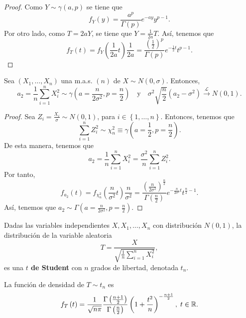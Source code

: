 \begin{proof}
Como $\displaystyle Y \sim \gamma\left(a, p\right) $ se tiene que
\[f_{Y}\left(y\right)=\frac{a^{p}}{\Gamma\left(p\right)}e^{-ay}y^{p-1} .\]
Por otro lado, como $\displaystyle T = 2aY $, se tiene que $\displaystyle Y = \frac{1}{2a}T $. Así, tenemos que
\[f_{T}\left(t\right)=f_{Y}\left(\frac{1}{2a}t\right)\frac{1}{2a}=\frac{\left(\frac{1}{2}\right)^{p}}{\Gamma\left(p\right)}e^{-\frac{1}{2}t}t ^{p-1} .\]
\end{proof}
\begin{prop}
Sea $\displaystyle \left(X_{1}, \ldots, X_{n}\right) $ una m.a.s. $\displaystyle \left(n\right) $ de $\displaystyle X \sim N\left(0,\sigma \right) $. Entonces, 
\[a_{2}=\frac{1}{n}\sum^{n}_{i = 1}X_{i}^{2} \sim \gamma\left(a = \frac{n}{2\sigma^{2}}, p= \frac{n}{2}\right) \quad \text{y} \quad \sigma^{2}\sqrt{\frac{n}{2}}\left(a_{2}-\sigma^{2}\right)\xrightarrow{\mathcal{L}} N\left(0,1\right) .\]
\end{prop}
\begin{proof}
	Sea $\displaystyle Z_{i}=\frac{X_{i}}{\sigma } \sim N\left(0,1\right) $, para $\displaystyle i \in \left\{ 1, \ldots, n\right\}  $. Entonces, tenemos que 
	\[\sum^{n}_{i= 1}Z_{i}^{2}\sim \chi_{n}^{2}\equiv \gamma\left(a = \frac{1}{2}, p = \frac{n}{2}\right) .\]
De esta manera, tenemos que 	
\[ a_{2}= \frac{1}{n}\sum^{n}_{i=1}X_{i}^{2} = \frac{\sigma^{2}}{n}\sum^{n}_{i= 1}Z_{i}^{2}.\]
Por tanto, 
\[f_{a_{2}}\left(t\right)= f_{\chi_{n}^{2}}\left(\frac{n}{\sigma^{2}}t\right)\frac{n}{\sigma^{2}} = \frac{\left(\frac{n}{2\sigma^{2}}\right)^{\frac{n}{2}}}{\Gamma\left(\frac{n}{2}\right)}e^{-\frac{n}{2\sigma^{2}}t}t ^{\frac{n}{2}-1} .\]
Así, tenemos que $\displaystyle a_{2} \sim \Gamma \left(a = \frac{n}{2\sigma^{2}}, p = \frac{n}{2}\right) $. 
\end{proof}
\begin{definition}
Dadas las variables independientes $\displaystyle X, X_{1}, \ldots, X_{n} $ con distribución $\displaystyle N\left(0,1\right) $, la distribución de la variable aleatoria 
\[T = \frac{X}{\sqrt{\frac{1}{n}\sum^{n}_{i=1}X_{i}^{2}}} ,\]
es una \textbf{$\displaystyle t $ de Student} con $\displaystyle n $ grados de libertad, denotada $\displaystyle t_{n} $.  
\end{definition}
\begin{prop}
La función de densidad de $\displaystyle T \sim t_{n} $ es
\[f_{T}\left(t\right)=\frac{1}{\sqrt{n\pi }}\frac{\Gamma\left(\frac{n+1}{2}\right)}{\Gamma\left(\frac{n}{2}\right)}\left(1+ \frac{t ^{2}}{n}\right)^{-\frac{n+1}{2}}, \; t \in \mathbb{R} .\]
\end{prop}
